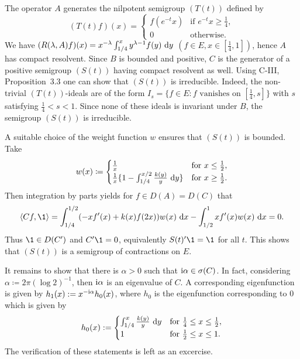 \begin{example}
The operator $A$ generates the nilpotent semigroup $(T(t))$ defined by
\begin{equation*}\label{eq:c4-2.13-kgk}
(T(t)f)(x) = \begin{cases}
    f(e^{-t}x) & \text{if } e^{-t}x \geq \frac{1}{4}, \\
    0 & \text{otherwise}.
\end{cases}
\end{equation*}
We have $(R(\lambda,A)f)(x) = x^{-\lambda}\int_{1/4}^{x} y^{\lambda-1}f(y) \, \mathop{}\!\mathrm{d}{y}$ $(f \in E, x \in [\frac{1}{4},1])$, hence $A$ has compact resolvent.
Since $B$ is bounded and positive, $C$ is the generator of a positive semigroup $(S(t))$ having compact resolvent as well.
Using C-III, Proposition~3.3 one can show that $(S(t))$ is irreducible.
Indeed, the non-trivial $(T(t))$-ideals are of the form $I_{s} = \{f \in E \colon f \text{ vanishes on } [\frac{1}{4},s]\}$ with $s$ satisfying $\frac{1}{4} < s < 1$.
Since none of these ideals is invariant under $B$, the semigroup $(S(t))$ is irreducible.

A suitable choice of the weight function $w$ ensures that $(S(t))$ is bounded.
Take
\begin{equation}\label{eq:c4-2.14}
w(x) \coloneqq \begin{cases}
    \frac{1}{x} & \text{for } x \leq \frac{1}{2}, \\
    \frac{1}{x}\{1 - \int_{1/4}^{x/2} \frac{k(y)}{y} \, \mathop{}\!\mathrm{d}{y} \} & \text{for } x \geq \frac{1}{2}.
\end{cases}
\end{equation}
Then integration by parts yields for $f \in D(A) = D(C)$ that
\begin{align*}
\langle Cf,\1 \rangle = \int_{1/4}^{1/2} (-xf'(x) + k(x)f(2x))w(x) \, \dx - \int_{1/2}^{1} xf'(x)w(x) \, \dx = 0.
\end{align*}
Thus $\1 \in D(C')$ and $C'\1 = 0$, equivalently $S(t)'\1 = \1$ for all $t$.
This shows that $(S(t))$ is a semigroup of contractions on $E$.

It remains to show that there is $\alpha > 0$ such that $\mathrm{i}\alpha \in \sigma(C)$.
In fact, considering $\alpha \coloneqq 2\pi(\log 2)^{-1}$,  then $\mathrm{i}\alpha$ is an eigenvalue of $C$.
A corresponding eigenfunction is given by $h_{1}(x) := x^{-\mathrm{i}\alpha}h_{0}(x)$, where $h_{0}$ is the eigenfunction corresponding to $0$ which is given by
\begin{equation}\label{eq:c4-2.15}
h_{0}(x) := \begin{cases}
    \int_{1/4}^{x} \frac{k(y)}{y} \, \mathop{}\!\mathrm{d}{y} & \text{for } \frac{1}{4} \leq x \leq \frac{1}{2}, \\
    1 & \text{for } \frac{1}{2} \leq x \leq 1.
\end{cases}
\end{equation}
The verification of these statements is left as an excercise.
\end{example}

